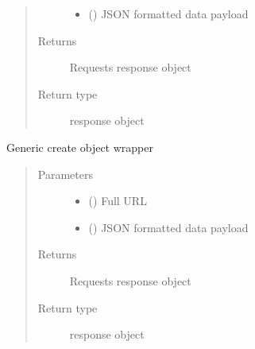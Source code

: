 \documentclass[letterpaper,10pt,english]{sphinxmanual}
\begin{document}
\begin{fulllineitems}
\begin{fulllineitems}
\begin{quote}
\begin{description}
\begin{itemize}
\item {} 
\sphinxAtStartPar
{} () \textendash{} JSON formatted data payload

\end{itemize}

\item[{Returns}] \leavevmode
\sphinxAtStartPar
Requests response object

\item[{Return type}] \leavevmode
\sphinxAtStartPar
response object

\end{description}\end{quote}

\end{fulllineitems}


\begin{fulllineitems}
\label{\detokenize{bloxone-class:bloxone.b1.update}}
\sphinxAtStartPar
Generic create object wrapper
\begin{quote}\begin{description}
\item[{Parameters}] \leavevmode\begin{itemize}
\item {} 
\sphinxAtStartPar
{} () \textendash{} Full URL

\item {} 
\sphinxAtStartPar
{} () \textendash{} JSON formatted data payload

\end{itemize}

\item[{Returns}] \leavevmode
\sphinxAtStartPar
Requests response object

\item[{Return type}] \leavevmode
\sphinxAtStartPar
response object

\end{description}\end{quote}

\end{fulllineitems}


\end{fulllineitems}
\end{document}
